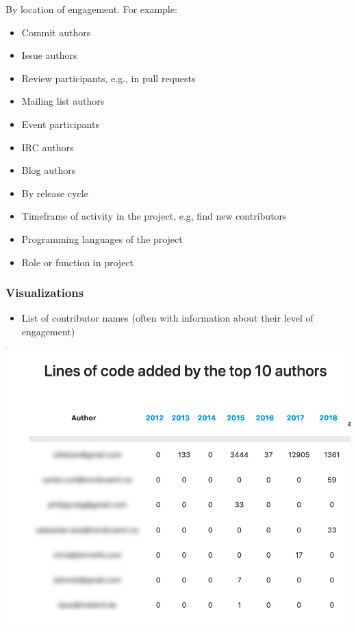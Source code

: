 By location of engagement. For example:

\begin{itemize}
\tightlist
\item
  Commit authors
\item
  Issue authors
\item
  Review participants, e.g., in pull requests
\item
  Mailing list authors
\item
  Event participants
\item
  IRC authors
\item
  Blog authors
\item
  By release cycle
\item
  Timeframe of activity in the project, e.g, find new contributors
\item
  Programming languages of the project
\item
  Role or function in project
\end{itemize}

\hypertarget{visualizations}{%
\subsubsection{Visualizations}\label{visualizations}}

\begin{itemize}
\tightlist
\item
  List of contributor names (often with information about their level of
  engagement)
\end{itemize}

\includegraphics{images/contributors_top-contributor-info.png}

